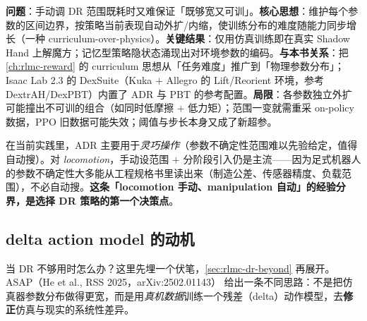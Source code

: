 \begin{paper}\label{paper:rlmc-dr-adr}
\textbf{问题}：手动调 DR 范围既耗时又难保证「既够宽又可训」。\textbf{核心思想}：维护每个参数的区间边界，按策略当前表现自动外扩/内缩，使训练分布的难度随能力同步增长（一种 curriculum-over-physics）。\textbf{关键结果}：仅用仿真训练即在真实 Shadow Hand 上解魔方；记忆型策略隐状态涌现出对环境参数的编码。\textbf{与本书关系}：把 \cref{ch:rlmc-reward} 的 curriculum 思想从「任务难度」推广到「物理参数分布」；Isaac Lab 2.3 的 DexSuite（Kuka $+$ Allegro 的 Lift/Reorient 环境，参考 DextrAH/DexPBT）内置了 ADR 与 PBT 的参考配置\cite{mittal2025isaaclab}。\textbf{局限}：各参数独立外扩可能撞出不可训的组合（如同时低摩擦 $+$ 低力矩）；范围一变就需重采 on-policy 数据，PPO 旧数据可能失效；阈值与步长本身又成了新超参。
\end{paper}

在当前实践里，ADR 主要用于\emph{灵巧操作}（参数不确定性范围难以先验给定，值得自动搜）。对 \emph{locomotion}，手动设范围 $+$ 分阶段引入仍是主流——因为足式机器人的参数不确定性大多能从工程规格书里读出来（制造公差、传感器精度、负载范围），不必自动搜。\textbf{这条「locomotion 手动、manipulation 自动」的经验分界，是选择 DR 策略的第一个决策点}。

\subsection{delta action model 的动机}
\label{sec:rlmc-dr-delta-motivation}

当 DR 不够用时怎么办？这里先埋一个伏笔，\cref{sec:rlmc-dr-beyond} 再展开。ASAP（He et al., RSS 2025，arXiv:2502.01143）\cite{asap2025} 给出一条不同思路：不是把仿真器参数分布做得更宽，而是用\emph{真机数据}训练一个残差（delta）动作模型，去\textbf{修正}仿真与现实的系统性差异。


